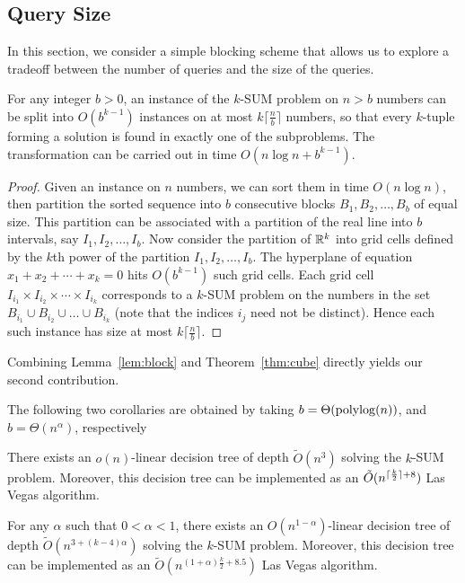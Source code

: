 \subsection{Query Size}%
\label{paper:ksum-algorithm:contrib:query-size}

In this section, we consider a simple blocking scheme that allows us to explore
a tradeoff between the number of queries and the size of the queries.

\begin{lemma}
\label{lem:block}
For any integer $b>0$, an instance of the \(k\)-SUM problem on $n>b$ numbers can be split into
$O(b^{k-1})$ instances on at most $k\lceil \frac{n}{b}\rceil$ numbers, so that every $k$-tuple
forming a solution is found in exactly one of the subproblems.
The transformation can be carried out in time $O(n\log n + b^{k-1})$.
\end{lemma}
\begin{proof}
Given an instance on $n$ numbers, we can sort them in time $O(n\log n)$, then partition
the sorted sequence into \(b\) consecutive blocks \(B_1, B_2,\ldots ,B_b\) of equal size.
This partition can be associated with a partition of the real line
into $b$ intervals, say $I_1, I_2,\ldots ,I_b$. Now consider the partition of $\mathbb{R}^k$
into grid cells defined by the $k$th power of the partition $I_1, I_2,\ldots ,I_b$. The
hyperplane of equation $x_1 + x_2 +\cdots +x_k = 0$ hits $O(b^{k-1})$ such grid cells.
Each grid cell $I_{i_1}\times I_{i_2}\times \cdots \times I_{i_k}$ corresponds to a
\(k\)-SUM problem on the numbers in the set $B_{i_1}\cup B_{i_2}\cup \ldots \cup B_{i_k}$ (note that
the indices $i_j$ need not be distinct). Hence each such instance has size at most $k\lceil \frac{n}{b}\rceil$.
\end{proof}

Combining Lemma~\ref{lem:block} and Theorem~\ref{thm:cube} directly yields our
second contribution.
%
\TheoremKSUMQuerySize*

The following two corollaries are obtained by taking
$b=\Theta(\operatorname{polylog}(n))$, and $b=\Theta(n^{\alpha})$, respectively
\begin{corollary}\label{cor:logn}
There exists an $o(n)$-linear decision tree of
depth $\tilde{O}(n^3)$ solving the \(k\)-SUM problem.
Moreover, this decision tree can be implemented as an
$\tilde{O}(n^{\lceil\frac{k}{2}\rceil+8})$ Las Vegas algorithm.
\end{corollary}
\begin{corollary}\label{cor:ne}
For any $\alpha$ such that $0<\alpha<1$,
there exists an $O(n^{1-\alpha})$-linear decision tree of
depth $\tilde{O} (n^{3+(k-4)\alpha})$ solving the \(k\)-SUM problem.
Moreover, this decision tree can be implemented as an
$\tilde{O}(n^{(1+\alpha)\frac{k}{2} + 8.5})$
Las Vegas algorithm.
\end{corollary}

